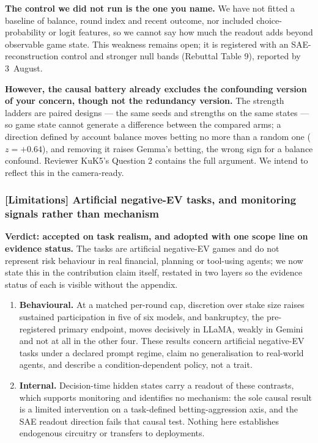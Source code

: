 \vspace{0.3em}
\noindent\textbf{The control we did not run is the one you name.} We have not fitted a baseline
of balance, round index and recent outcome, nor included choice-probability or logit features,
so we cannot say how much the readout adds beyond observable game state. This weakness remains
open; it is registered with an SAE-reconstruction control and stronger null bands (Rebuttal
Table 9), reported by 3~August.

\vspace{0.3em}
\noindent\textbf{However, the causal battery already excludes the confounding version of your
concern, though not the redundancy version.} The strength ladders are paired designs --- the
same seeds and strengths on the same states --- so game state cannot generate a difference
between the compared arms; a direction defined by account balance moves betting no more than a
random one ($z = +0.64$), and removing it raises Gemma's betting, the wrong sign for a balance
confound. Reviewer KuK5's Question 2 contains the full argument. We intend to reflect this in
the camera-ready.


\subsubsection*{\textbf{[Limitations]} Artificial negative-EV tasks, and monitoring signals rather than mechanism}

\textbf{Verdict: accepted on task realism, and adopted with one scope line on evidence status.}
The tasks are artificial negative-EV games and do not represent risk behaviour in real
financial, planning or tool-using agents; we now state this in the contribution claim itself,
restated in two layers so the evidence status of each is visible without the appendix.

\begin{enumerate}[leftmargin=1.8em]
\item \textbf{Behavioural.} At a matched per-round cap, discretion over stake size raises
sustained participation in five of six models, and bankruptcy, the pre-registered primary
endpoint, moves decisively in LLaMA, weakly in Gemini and not at all in the other four. These
results concern artificial negative-EV tasks under a declared prompt regime, claim no
generalisation to real-world agents, and describe a condition-dependent policy, not a trait.
\item \textbf{Internal.} Decision-time hidden states carry a readout of these contrasts, which
supports monitoring and identifies no mechanism: the sole causal result is a limited
intervention on a task-defined betting-aggression axis, and the SAE readout direction fails
that causal test. Nothing here establishes endogenous circuitry or transfers to deployments.
\end{enumerate}

